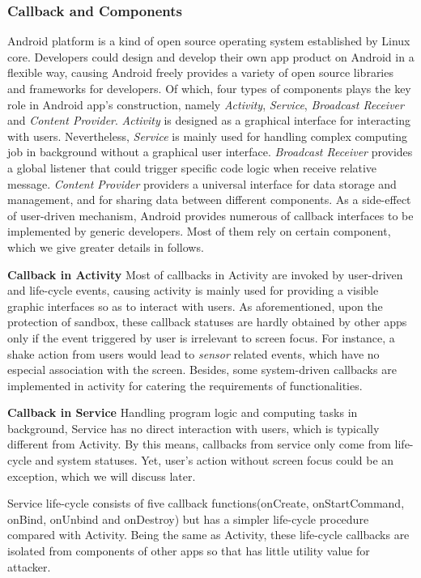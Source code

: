 \subsubsection{Callback and Components}
Android platform is a kind of open source operating system established by Linux core. Developers could design and develop their own app product on Android in a flexible way, causing Android freely provides a variety of open source libraries and frameworks for developers. Of which, four types of components plays the key role in Android app's construction, namely \textit{Activity}, \textit{Service}, \textit{Broadcast Receiver} and \textit{Content Provider}. \textit{Activity} is designed as a graphical interface for interacting with users. Nevertheless, \textit{Service} is mainly used for handling complex computing job in background without a graphical user interface. \textit{Broadcast Receiver} provides a global listener that could trigger specific code logic when receive relative message. \textit{Content Provider} providers a universal interface for data storage and management, and for sharing data between different components. As a side-effect of user-driven mechanism, Android provides numerous of callback interfaces to be implemented by generic developers. Most of them rely on certain component, which we give greater details in follows.

\textbf{Callback in Activity} 
Most of callbacks in Activity are invoked by user-driven and life-cycle events, causing activity is mainly used for providing a visible graphic interfaces so as to interact with users. As aforementioned, upon the protection of sandbox, these callback statuses are hardly obtained by other apps only if the event triggered by user is irrelevant to screen focus. For instance, a shake action from users would lead to \textit{sensor} related events, which have no especial association with the screen. Besides, some system-driven callbacks are implemented in activity for catering the requirements of functionalities. 

\textbf{Callback in Service} 
Handling program logic and computing tasks in background, Service has no direct interaction with users, which is typically different from Activity. By this means, callbacks from service only come from life-cycle and system statuses. Yet, user's action without screen focus could be an exception, which we will discuss later.

Service life-cycle consists of five callback functions(onCreate, onStartCommand, onBind, onUnbind and onDestroy) but has a simpler life-cycle procedure compared with Activity. Being the same as Activity, these life-cycle callbacks are isolated from components of other apps so that has little utility value for attacker. 

